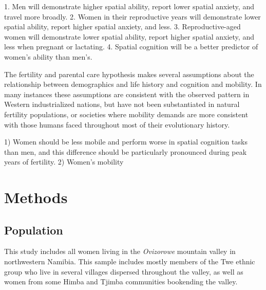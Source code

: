 1.  Men will demonstrate higher spatial ability, report lower spatial anxiety, and travel more broadly. 	
2.  Women in their reproductive years will demonstrate lower spatial ability, report higher spatial anxiety, and less.
3.  Reproductive-aged women will demonstrate lower spatial ability, report higher spatial anxiety, and less when pregnant or lactating.
4.  Spatial cognition will be a better predictor of women's ability than men's. 
	
The fertility and parental care hypothesis makes several assumptions about the relationship between demographics and life history and cognition and mobility.  In many instances these assumptions are consistent with the observed pattern in Western industrialized nations, but have not been substantiated in natural fertility populations, or societies where mobility demands are more consistent with those humans faced throughout most of their evolutionary history.

1) Women should be less mobile and perform worse in spatial cognition tasks than men, and this difference should be particularly pronounced during peak years of fertility.  2) Women's mobility 



\section{Methods}
\label{sec:2}
	\subsection{Population}
This study includes all women living in the \emph{Ovizorowe} mountain valley in northwestern Namibia.  This sample includes mostly members of the Twe ethnic group who live in several villages dispersed throughout the valley, as well as women from some Himba and Tjimba communities bookending the valley. 

